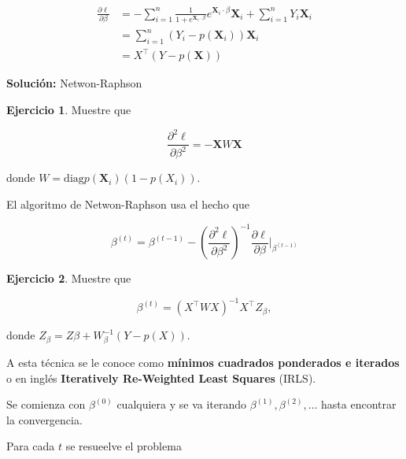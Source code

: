\documentclass[
  12pt,
]{book}
\theoremstyle{definition}
\theoremstyle{definition}
\theoremstyle{definition}
\newtheorem{exercise}{Ejercicio}[chapter]
\theoremstyle{remark}
\begin{document}
\begin{align*}
\frac{\partial \ell}{\partial \beta} 
&=-\sum_{i=1}^{n} \frac{1}{1+e^{\boldsymbol{X}_{i} \cdot \beta}} e^{\boldsymbol{X}_{i} \cdot \beta} \boldsymbol{X}_{i}+\sum_{i=1}^{n} Y_{i} \boldsymbol{X}_{i} \\
&=\sum_{i=1}^{n}\left(Y_{i}-p\left(\boldsymbol{X}_{i}\right)\right) \boldsymbol{X}_{i} \\
&= X^{\top}(Y-p(\boldsymbol{X}))
\end{align*}

\textbf{Solución:} Netwon-Raphson

\begin{exercise}

Muestre que

\begin{equation*}
\frac{\partial^{2} \ell}{\partial \beta^{2}} = -\boldsymbol{X}W\boldsymbol{X} 
\end{equation*}

donde \(W = \mathrm{diag}{p(\boldsymbol{X}_{i})(1-p(X_{i}))}\).

\end{exercise}

El algoritmo de Netwon-Raphson usa el hecho que

\begin{equation*}
\beta^{(t)} = \beta ^{(t-1)} - \left(  \frac{\partial^{2} \ell}{\partial \beta^{2}}\right)^{-1} \frac{\partial \ell}{\partial \beta}  \Bigg\vert_{\beta ^{(t-1)}}
\end{equation*}

\begin{exercise}

Muestre que

\begin{equation*}
\beta^{(t)} = \left( X^{\top}WX \right)^{-1}X^{\top}Z_{\beta},
\end{equation*}

donde \(Z_{\beta} = Z\beta + W^{-1}_{\beta} (Y-p(X))\).

\end{exercise}

A esta técnica se le conoce como \textbf{mínimos cuadrados ponderados e iterados} o en inglés \textbf{Iteratively Re-Weighted Least Squares} (IRLS).

Se comienza con \(\beta^{(0)}\) cualquiera y se va iterando \(\beta^{(1)}, \beta^{(2)}, \ldots\) hasta encontrar la convergencia.

Para cada \(t\) se resueelve el problema
\end{document}
